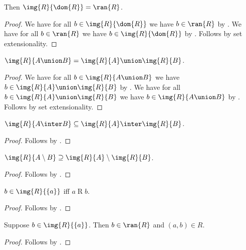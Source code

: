 \begin{proposition}\label{img_dom}
    Then $\img{R}{\dom{R}} = \ran{R}$.
\end{proposition}
\begin{proof}
    We have for all $b\in\img{R}{\dom{R}}$ we have $b\in\ran{R}$
        by .
    We have for all $b\in\ran{R}$ we have $b\in\img{R}{\dom{R}}$
        by .
    Follows by set extensionality.
\end{proof}

\begin{proposition}\label{img_union}
    $\img{R}{A\union B} = \img{R}{A}\union\img{R}{B}$.
\end{proposition}
\begin{proof}
    We have for all $b\in\img{R}{A\union B}$
        we have $b\in\img{R}{A}\union\img{R}{B}$
        by .
    We have for all $b\in\img{R}{A}\union\img{R}{B}$
        we have $b\in\img{R}{A\union B}$
        by .
    Follows by set extensionality.
\end{proof}

\begin{proposition}\label{img_inter}
    $\img{R}{A\inter B}\subseteq \img{R}{A}\inter\img{R}{B}$.
\end{proposition}
\begin{proof}
    Follows by .
\end{proof}

\begin{proposition}\label{img_setminus}
    $\img{R}{A\setminus B}\supseteq \img{R}{A}\setminus\img{R}{B}$.
\end{proposition}
\begin{proof}
    Follows by .
\end{proof}

\begin{proposition}\label{img_singleton_iff}
    $b\in \img{R}{\{a\}}$ iff $a\mathrel{R}b$.
\end{proposition}
\begin{proof}
    Follows by .
\end{proof}

\begin{proposition}\label{img_singleton_intro}
    Suppose $b\in\img{R}{\{a\}}$.
    Then $b\in\ran{R}$ and $(a,b)\in R$.
\end{proposition}
\begin{proof}
    Follows by .
\end{proof}

